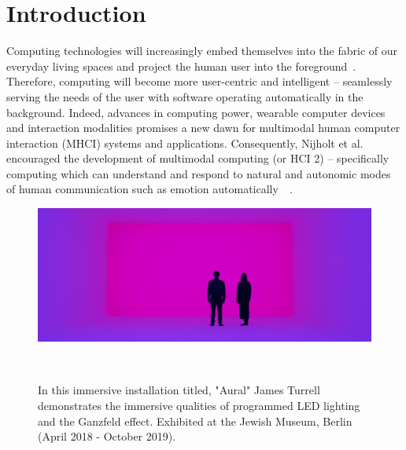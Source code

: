 \documentclass{sigchi}
\begin{document}
\section{Introduction}

Computing technologies will increasingly embed themselves into the fabric of our everyday living spaces and project the human user into the foreground~\cite{6634207}. Therefore, computing will become more user-centric and intelligent – seamlessly serving the needs of the user with software operating automatically in the background. Indeed, advances in computing power, wearable computer devices and interaction modalities promises a new dawn for multimodal human computer interaction (MHCI) systems and applications. Consequently, Nijholt et al. encouraged the development of multimodal computing (or HCI 2) – specifically computing which can understand and respond to natural and autonomic modes of human communication such as emotion automatically~\cite{pantic2008human}~\cite{6634207}.

\begin{figure}
  \centering
  \includegraphics[width=1.75\columnwidth]{figures/turrell}
  \caption{In this immersive installation titled, "Aural" James Turrell demonstrates the immersive qualities of programmed LED lighting and the Ganzfeld effect. Exhibited at the Jewish Museum, Berlin (April 2018 - October 2019).}~\label{fig:figure2}
\end{figure}
\end{document}
